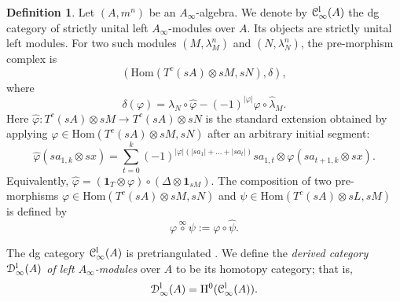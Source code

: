 \documentclass[a4paper, 11pt]{amsart}
\theoremstyle{definition}
\newtheorem{defn}[thm]{Definition}
\theoremstyle{remark}
\numberwithin{equation}{section}
\newcommand{\LL}{\mathrm{l}}
\newcommand{\Hom}{\mathrm{Hom}}
\newcommand{\id}{\mathbf{1}}
\newcommand{\EC}{\EuScript{C}}
\newcommand{\ED}{\EuScript{D}}
\begin{document}
\begin{defn}
Let $(A,m^n)$ be an $A_\infty$-algebra. We denote by $\EC^{\LL}_\infty(A)$ the dg category of strictly unital left $A_\infty$-modules over $A$. Its objects are strictly unital left modules. For two such modules $(M,\lambda_M^n)$ and $(N,\lambda_N^n)$, the pre-morphism complex is
\[
(\Hom(T^c(sA)\otimes sM,sN),\delta),
\]
where
\[
\delta(\varphi)=\lambda_N\circ \widehat\varphi-(-1)^{|\varphi|}\varphi\circ \widehat\lambda_M.
\]
Here $\widehat\varphi\colon T^c(sA)\otimes sM\to T^c(sA)\otimes sN$ is the standard extension obtained by applying $\varphi\in \Hom(T^c(sA)\otimes sM,sN)$ after an arbitrary initial segment:
$$\widehat \varphi(sa_{1,k}\otimes sx) = \sum_{t=0}^k (-1)^{|\varphi|(|sa_1|+\dots+|sa_t|)} sa_{1, t}\otimes \varphi(sa_{t+1,k} \otimes sx).$$
Equivalently, $\widehat{\varphi}=(\id_T\otimes \varphi)\circ (\Delta\otimes \id_{sM})$.
The composition of two pre-morphisms $\varphi \in \Hom(T^c(sA) \otimes sM , sN)$ and $\psi \in \Hom(T^c(sA) \otimes sL , sM)$ is defined by
\[
 \varphi\overset{\infty}{\circ} \psi := \varphi \circ \widehat \psi .
\]

The dg category $\EC^{\LL}_\infty(A)$ is pretriangulated \cite{Kel01a}. We define the {\it derived category $\ED^{\LL}_{\infty}(A)$ of left $A_\infty$-modules} over $A$ to be its homotopy category; that is, \begin{align}\label{align:definderived}
\ED^{\LL}_{\infty}(A) = \mathrm H^0(\EC^{\LL}_\infty(A)).
\end{align}
\end{defn}
\end{document}
